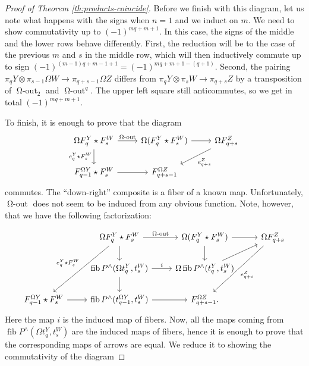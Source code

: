 \documentclass{amsart}
\theoremstyle{definition}
\newcommand{\fib}{\operatorname{fib}}
\newcommand{\oout}{\operatorname{\Omega-out}}
\newcommand{\join}{\star}
\newcommand{\ooutk}[1]{\operatorname{\Omega-out}^{#1}}
\begin{document}
\begin{proof}[Proof of Theorem \ref{th:products-coincide}]
    Before we finish with this diagram, let us note what happens with the signs when $n=1$ and we induct on $m$. We need to show commutativity up to $(-1)^{mq+m+1}$.
    In this case, the signs of the middle and the lower rows behave differently. First, the reduction will be to the case of the previous $m$ and $s$ in the middle row, which will then inductively commute up to sign $(-1)^{(m-1)q+m-1+1} = (-1)^{mq+m+1-(q+1)}$. Second, the pairing $\pi_{q} Y \otimes \pi_{s-1} \Omega W \to \pi_{q+s-1 } \Omega Z$ differs from $\pi_{q} Y \otimes \pi_s W \to \pi_{q+s} Z$ by a transposition of $\oout_2$ and $\ooutk{q}$. The upper left square still anticommutes, so we get in total $(-1)^{mq+m+1}$.

    To finish, it is enough to prove that the diagram
    \[\begin{tikzcd}
    	{\Omega F_q^Y \join F_s^W} & {\Omega (F_q^Y \join F_s^W)} & {\Omega F^Z_{q+s}} \\
    	{F_{q-1}^{\Omega Y} \join F_s^W} & {F^{\Omega Z}_{q+s-1}}
    	\arrow["\oout", from=1-1, to=1-2]
    	\arrow["{e^Y_{q} \join F^W_s}"', from=1-1, to=2-1]
    	\arrow[from=1-2, to=1-3]
    	\arrow["{e^Z_{q+s}}", from=1-3, to=2-2]
    	\arrow[from=2-1, to=2-2]
    \end{tikzcd}\]
    commutes. The ``down-right'' composite is a fiber of a known map. Unfortunately, $\oout$ does not seem to be induced from any obvious function. Note, however, that we have the following factorization:

    \[\begin{tikzcd}
    	& {\Omega F_q^Y \join F_s^W} & {\Omega (F_q^Y \join F_s^W)} & {\Omega F^Z_{q+s}} \\
    	& {\fib P^{\wedge}{(\Omega t_q^Y, t_s^W)}} & {\Omega \fib P^{\wedge}{(t_q^Y, t_s^W)}} \\
    	{F_{q-1}^{\Omega Y} \join F_s^W} & {\fib P^\wedge(t_{q-1}^{\Omega Y}, t_s^W)} & {F^{\Omega Z}_{q+s-1}.}
    	\arrow["\oout", from=1-2, to=1-3]
    	\arrow[from=1-2, to=2-2]
    	\arrow["{e^Y_{q} \join F^W_s}"', from=1-2, to=3-1]
    	\arrow[from=1-3, to=1-4]
    	\arrow[from=1-3, to=2-3]
    	\arrow["{e^Z_{q+s}}", from=1-4, to=3-3]
    	\arrow["i", from=2-2, to=2-3]
    	\arrow[from=2-2, to=3-2]
    	\arrow[from=2-3, to=1-4]
    	\arrow[from=3-1, to=3-2]
    	\arrow[from=3-2, to=3-3]
    \end{tikzcd}\]
    Here the map $i$ is the induced map of fibers. Now, all the maps coming from $\fib P^{\wedge}{(\Omega t_q^Y, t_s^W)}$ are the induced maps of fibers, hence it is enough to prove that the corresponding maps of arrows are equal. We reduce it to showing the commutativity of the diagram


\end{proof}
\end{document}
